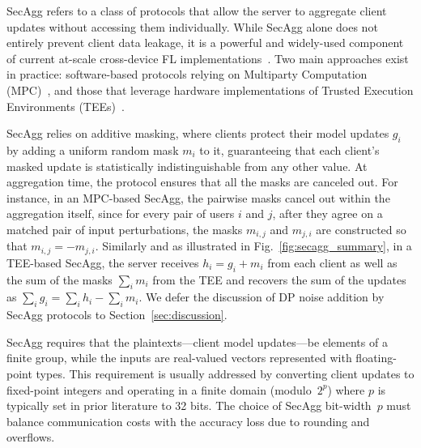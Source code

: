 \documentclass[11pt]{article}
\newcommand{\SecAgg}{{\sc SecAgg}\xspace}
\begin{document}
\SecAgg refers to a class of protocols that allow the server to aggregate client updates without accessing them individually. While \SecAgg alone does not entirely prevent client data leakage, it is a powerful and widely-used component of current at-scale cross-device FL implementations~\cite{Graham-kairouz2019advances}. Two main approaches exist in practice: software-based protocols relying on Multiparty Computation (MPC)~\cite{Graham-bonavitz2019federated,Graham-bell2020secure,Graham-LightSecAgg}, and those that leverage hardware implementations of Trusted Execution Environments (TEEs)~\cite{Graham-huba2021papaya}.


\SecAgg relies on additive masking, where clients protect their model updates $g_i$ by adding a uniform random mask $m_i$ to it, guaranteeing that each client’s masked update is statistically indistinguishable from any other value.
At aggregation time, the protocol ensures that all the masks are canceled out. For instance, in an MPC-based \SecAgg, the pairwise masks cancel out within the aggregation itself, since for every pair of users $i$ and $j$, after they agree on a matched pair of input perturbations, the masks $m_{i,j}$ and $m_{j,i}$ are constructed so that $m_{i,j}=-m_{j,i}$.
Similarly and as illustrated in Fig.~\ref{fig:secagg_summary}, in a TEE-based \SecAgg, the server receives $h_i = g_i + m_i$ from each client as well as the sum of the masks $\sum_i m_i$ from the TEE and recovers the sum of the updates as
$
      \sum_i g_i = \sum_i h_i - \sum_i m_i.
$
We defer the discussion of DP noise addition by \SecAgg protocols to Section~\ref{sec:discussion}.

\SecAgg requires that the plaintexts---client model updates---be elements of a finite group, while the inputs are real-valued vectors represented with floating-point types.
This requirement is usually addressed by converting client updates to fixed-point integers and operating in a finite domain (modulo~$2^p$) where $p$ is typically set in prior literature to 32 bits. The choice of \SecAgg bit-width~$p$ must balance communication costs with the accuracy loss due to rounding and overflows.
\end{document}
